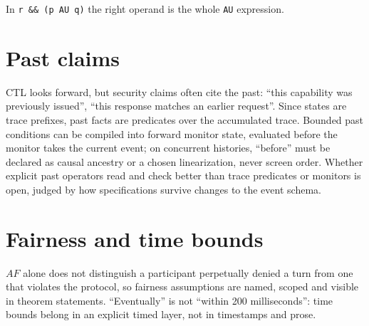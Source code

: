 In \texttt{r \&\& (p AU q)} the right operand is the whole \texttt{AU} expression.

\section{Past claims}

CTL looks forward, but security claims often cite the past: ``this capability was
previously issued'', ``this response matches an earlier request''. Since states
are trace prefixes, past facts are predicates over the accumulated trace. Bounded
past conditions can be compiled into forward monitor state, evaluated before the
monitor takes the current event; on concurrent histories, ``before'' must be
declared as causal ancestry or a chosen linearization, never screen order. Whether
explicit past operators read and check better than trace predicates or monitors is
open, judged by how specifications survive changes to the event schema.

\section{Fairness and time bounds}

$AF$ alone does not distinguish a participant perpetually denied a turn from one
that violates the protocol, so fairness assumptions are named, scoped and visible
in theorem statements. ``Eventually'' is not ``within 200 milliseconds'': time
bounds belong in an explicit timed layer, not in timestamps and prose.
